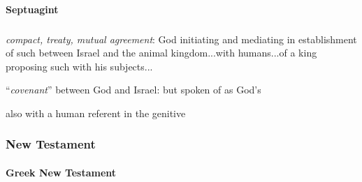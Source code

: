 		\paragraph{Septuagint}
			\label{COVENANT-LXX}
		
			\subparagraph{\texorpdfstring{}{}}
			
				\begin{compactdesc}
					\item[GELS 150b, PDF 150] \textbf{}
						\begin{compactitem}
							\item[1] \textit{compact, treaty, mutual agreement}: God initiating and mediating in establishment of such between Israel and the animal kingdom...with humans...of a king proposing such with his subjects...
							\item[2a] ``\textit{covenant}'' between God and Israel: but spoken of as God's
							\item[2b] also with a human referent in the genitive
						\end{compactitem}
				\end{compactdesc}
		
	\subsubsection{New Testament} %
		\label{COVENANT-NT}
	
			
	
			
			
		\paragraph{Greek New Testament} %
			\label{COVENANT-GREEK}
		
			\subparagraph{\texorpdfstring{}{}}
				\label{DIATHEKE}
				
